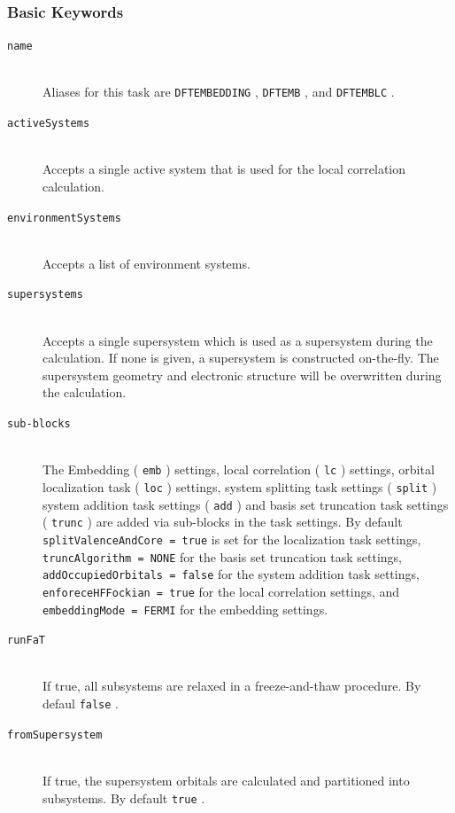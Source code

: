 \documentclass[bibliography=totocnumbered,a4paper,10pt,oneside]{scrbook}
\newcommand{\ttt}[1]{%
  \begingroup\setlength{\fboxsep}{1pt}%
  \colorbox{serenity-green!30}{\texttt{\hspace*{2pt}\vphantom{(g}#1\hspace*{2pt}}}%
  \endgroup
}
\begin{document}
\subsubsection{Basic Keywords}
\begin{description}
  \item [\texttt{name}]\hfill \\
    Aliases for this task are \ttt{DFTEMBEDDING}, \ttt{DFTEMB},  and \ttt{DFTEMBLC}.
  \item [\texttt{activeSystems}]\hfill \\
    Accepts a single active system that is used for the local correlation calculation.
  \item [\texttt{environmentSystems}]\hfill \\
    Accepts a list of environment systems.
  \item [\texttt{supersystems}]\hfill \\
    Accepts a single supersystem which is used as a supersystem during the calculation.
    If none is given, a supersystem is constructed on-the-fly. The supersystem geometry and
    electronic structure will be overwritten during the calculation.
 \item [\texttt{sub-blocks}]\hfill \\
  The Embedding (\ttt{emb}) settings, local correlation (\ttt{lc}) settings,
  orbital localization task (\ttt{loc}) settings, system splitting task settings (\ttt{split})
  system addition task settings (\ttt{add}) and basis set truncation task settings (\ttt{trunc})
  are added via sub-blocks in the task settings.
  By default \ttt{splitValenceAndCore = true} is set for the localization task settings,
  \ttt{truncAlgorithm = NONE} for the basis set truncation task settings,
  \ttt{addOccupiedOrbitals = false} for the system addition task settings,
  \ttt{enforeceHFFockian = true} for the local correlation settings,
  and \ttt{embeddingMode = FERMI} for the embedding settings.
 \item [\texttt{runFaT}]\hfill \\
 If true, all subsystems are relaxed in a freeze-and-thaw procedure. By defaul \ttt{false}.
 \item [\texttt{fromSupersystem}]\hfill \\
 If true, the supersystem orbitals are calculated and partitioned into subsystems. By default \ttt{true}.
\end{description}
\end{document}
